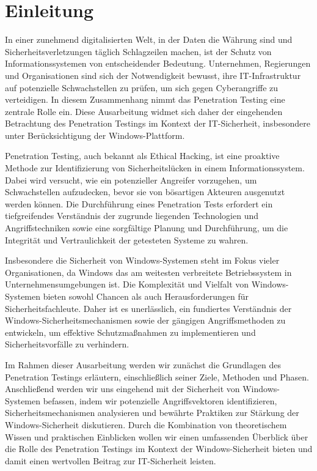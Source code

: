 \section{Einleitung}
In einer zunehmend digitalisierten Welt, in der Daten die Währung sind und Sicherheitsverletzungen täglich Schlagzeilen machen, ist der Schutz von Informationssystemen von entscheidender Bedeutung. Unternehmen, Regierungen und Organisationen sind sich der Notwendigkeit bewusst, ihre IT-Infrastruktur auf potenzielle Schwachstellen zu prüfen, um sich gegen Cyberangriffe zu verteidigen. In diesem Zusammenhang nimmt das Penetration Testing eine zentrale Rolle ein. Diese Ausarbeitung widmet sich daher der eingehenden Betrachtung des Penetration Testings im Kontext der IT-Sicherheit, insbesondere unter Berücksichtigung der Windows-Plattform.

Penetration Testing, auch bekannt als Ethical Hacking, ist eine proaktive Methode zur Identifizierung von Sicherheitslücken in einem Informationssystem. Dabei wird versucht, wie ein potenzieller Angreifer vorzugehen, um Schwachstellen aufzudecken, bevor sie von bösartigen Akteuren ausgenutzt werden können. Die Durchführung eines Penetration Tests erfordert ein tiefgreifendes Verständnis der zugrunde liegenden Technologien und Angriffstechniken sowie eine sorgfältige Planung und Durchführung, um die Integrität und Vertraulichkeit der getesteten Systeme zu wahren.

Insbesondere die Sicherheit von Windows-Systemen steht im Fokus vieler Organisationen, da Windows das am weitesten verbreitete Betriebssystem in Unternehmensumgebungen ist. Die Komplexität und Vielfalt von Windows-Systemen bieten sowohl Chancen als auch Herausforderungen für Sicherheitsfachleute. Daher ist es unerlässlich, ein fundiertes Verständnis der Windows-Sicherheitsmechanismen sowie der gängigen Angriffsmethoden zu entwickeln, um effektive Schutzmaßnahmen zu implementieren und Sicherheitsvorfälle zu verhindern.

Im Rahmen dieser Ausarbeitung werden wir zunächst die Grundlagen des Penetration Testings erläutern, einschließlich seiner Ziele, Methoden und Phasen. Anschließend werden wir uns eingehend mit der Sicherheit von Windows-Systemen befassen, indem wir potenzielle Angriffsvektoren identifizieren, Sicherheitsmechanismen analysieren und bewährte Praktiken zur Stärkung der Windows-Sicherheit diskutieren. Durch die Kombination von theoretischem Wissen und praktischen Einblicken wollen wir einen umfassenden Überblick über die Rolle des Penetration Testings im Kontext der Windows-Sicherheit bieten und damit einen wertvollen Beitrag zur IT-Sicherheit leisten.

